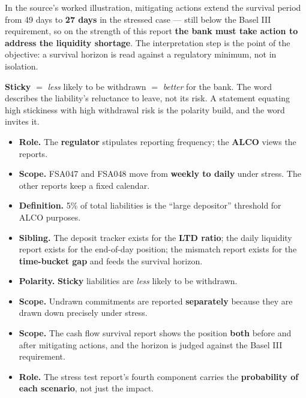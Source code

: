 \begin{lrkeybox}
In the source's worked illustration, mitigating actions extend the survival period from 49 days to \textbf{27 days} in the stressed case --- still below the Basel III requirement, so on the strength of this report \textbf{the bank must take action to address the liquidity shortage}. The interpretation step is the point of the objective: a survival horizon is read against a regulatory minimum, not in isolation.
\end{lrkeybox}

\begin{lrtrapbox}
\textbf{Sticky} $=$ \emph{less} likely to be withdrawn $=$ \emph{better} for the bank. The word describes the liability's reluctance to leave, not its risk. A statement equating high stickiness with high withdrawal risk is the polarity build, and the word invites it.
\end{lrtrapbox}

\begin{lrtrapbox}
\begin{itemize}
\item \textbf{Role.} The \textbf{regulator} stipulates reporting frequency; the \textbf{ALCO} views the reports.
\item \textbf{Scope.} FSA047 and FSA048 move from \textbf{weekly to daily} under stress. The other reports keep a fixed calendar.
\item \textbf{Definition.} 5\% of total liabilities is the ``large depositor'' threshold for ALCO purposes.
\item \textbf{Sibling.} The deposit tracker exists for the \textbf{LTD ratio}; the daily liquidity report exists for the end-of-day position; the mismatch report exists for the \textbf{time-bucket gap} and feeds the survival horizon.
\item \textbf{Polarity.} \textbf{Sticky} liabilities are \emph{less} likely to be withdrawn.
\item \textbf{Scope.} Undrawn commitments are reported \textbf{separately} because they are drawn down precisely under stress.
\item \textbf{Scope.} The cash flow survival report shows the position \textbf{both} before and after mitigating actions, and the horizon is judged against the Basel III requirement.
\item \textbf{Role.} The stress test report's fourth component carries the \textbf{probability of each scenario}, not just the impact.
\end{itemize}
\end{lrtrapbox}
